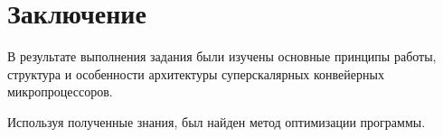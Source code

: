 \section{Заключение}

В результате выполнения задания были изучены основные принципы работы, структура и особенности архитектуры суперскалярных конвейерных микропроцессоров.

Используя полученные знания, был найден метод оптимизации программы.